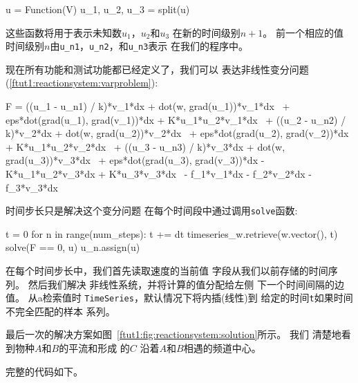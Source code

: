 \begin{python}
u = Function(V)
u_1, u_2, u_3 = split(u)
\end{python}
这些函数将用于表示未知数$u_1$，$u_2$和$u_3$
在新的时间级别$n+1$。 前一个相应的值
时间级别$n$由\verb!u_n1!，\verb!u_n2!，和\verb!u_n3!表示 在我们的程序中。

现在所有功能和测试功能都已经定义了，我们可以
表达非线性变分问题
(\ref{ftut1:reactionsystem:varproblem}):

\begin{python}
F = ((u_1 - u_n1) / k)*v_1*dx + dot(w, grad(u_1))*v_1*dx \
  + eps*dot(grad(u_1), grad(v_1))*dx + K*u_1*u_2*v_1*dx  \
  + ((u_2 - u_n2) / k)*v_2*dx + dot(w, grad(u_2))*v_2*dx \
  + eps*dot(grad(u_2), grad(v_2))*dx + K*u_1*u_2*v_2*dx  \
  + ((u_3 - u_n3) / k)*v_3*dx + dot(w, grad(u_3))*v_3*dx \
  + eps*dot(grad(u_3), grad(v_3))*dx - K*u_1*u_2*v_3*dx + K*u_3*v_3*dx \
  - f_1*v_1*dx - f_2*v_2*dx - f_3*v_3*dx
\end{python}

时间步长只是解决这个变分问题
在每个时间段中通过调用\texttt{solve}函数:

\begin{python}
t = 0
for n in range(num_steps):
    t += dt
    timeseries_w.retrieve(w.vector(), t)
    solve(F == 0, u)
    u_n.assign(u)
\end{python}
在每个时间步长中，我们首先读取速度的当前值
字段从我们以前存储的时间序列。 然后我们解决
非线性系统，并将计算的值分配给左侧
下一个时间间隔的边值。 从a检索值时
\texttt{TimeSeries}，默认情况下将内插(线性)到
给定的时间\texttt{t}如果时间不完全匹配的样本
系列。

最后一次的解决方案如图~\ref{ftut1:fig:reactionsystem:solution}所示。 我们
清楚地看到物种$A$和$B$的平流和形成
的$C$
沿着$A$和$B$相遇的频道中心。


完整的代码如下。

